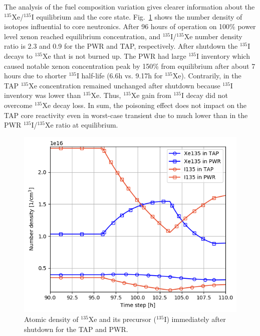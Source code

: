 \documentclass{anstrans}
\begin{document}
The analysis of the fuel composition variation gives clearer information about 
the $^{135}$Xe/$^{135}$I equilibrium and the core state. Fig.~\ref{fig:compos} 
shows the number density of isotopes influential to core neutronics. After 96 
hours of operation on 100\% power level xenon reached 
equilibrium concentration, and $^{135}$I/$^{135}$Xe number density ratio is 
2.3 and 0.9 for the \gls{PWR} and \gls{TAP}, respectively. After shutdown the 
$^{135}$I decays to $^{135}$Xe that is not burned up. The \gls{PWR} had large 
$^{135}$I inventory which caused notable xenon concentration peak by 150\% 
from equilibrium after about 7 hours due to shorter $^{135}$I half-life (6.6h 
vs. 9.17h for $^{135}$Xe). Contrarily, in the \gls{TAP} $^{135}$Xe 
concentration remained unchanged after shutdown because $^{135}$I inventory 
was lower than $^{135}$Xe. Thus, $^{135}$Xe gain from $^{135}$I decay did not 
overcome $^{135}$Xe decay loss. In sum, the poisoning effect does not impact  
on the \gls{TAP} core reactivity even in worst-case transient due to 
much lower than in the \gls{PWR} $^{135}$I/$^{135}$Xe ratio at equilibrium.
\begin{figure}[htbp!] %
        \centering
        \includegraphics[width=1.07\linewidth]{tap_vs_pwr_xe_i_density.png}
        \caption{Atomic density of $^{135}$Xe and its precursor ($^{135}$I) 
        immediately after shutdown for the \gls{TAP} and \gls{PWR}.}
        \vspace{-0.2in}
        \label{fig:compos}
\end{figure}
\end{document}
